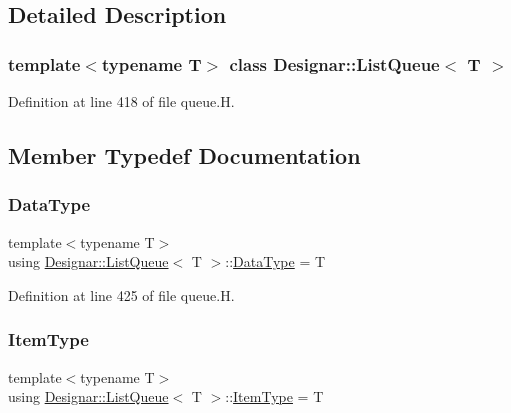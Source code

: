 \subsection{Detailed Description}
\subsubsection*{template$<$typename T$>$\newline
class Designar\+::\+List\+Queue$<$ T $>$}



Definition at line 418 of file queue.\+H.



\subsection{Member Typedef Documentation}
\mbox{\label{class_designar_1_1_list_queue_a5aae5b0703cf71bce7457e5420d59c8f}} 
\subsubsection{\texorpdfstring{Data\+Type}{DataType}}
{\footnotesize\ttfamily template$<$typename T$>$ \\
using \hyperlink{class_designar_1_1_list_queue}{Designar\+::\+List\+Queue}$<$ T $>$\+::\hyperlink{class_designar_1_1_s_l_list_aa98659227d90b392a1b52fa5e9b292f4}{Data\+Type} =  T}



Definition at line 425 of file queue.\+H.

\mbox{\label{class_designar_1_1_list_queue_ab2057fd5d92eccf8de8daed70e0182b2}} 
\subsubsection{\texorpdfstring{Item\+Type}{ItemType}}
{\footnotesize\ttfamily template$<$typename T$>$ \\
using \hyperlink{class_designar_1_1_list_queue}{Designar\+::\+List\+Queue}$<$ T $>$\+::\hyperlink{class_designar_1_1_s_l_list_a8ec47bfb6b0d74c8f85111b7b3c05cb2}{Item\+Type} =  T}



